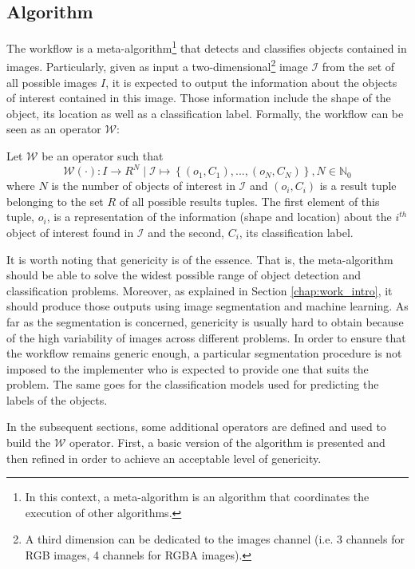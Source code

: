 \subsection{Algorithm}
\label{ssec:workflow_algo}
The workflow is a meta-algorithm\footnote{In this context, a meta-algorithm is an algorithm that coordinates the execution of other algorithms.} that detects and classifies objects contained in images. Particularly, given as input a two-dimensional\footnote{A third dimension can be dedicated to the images channel (i.e. 3 channels for RGB images, 4 channels for RGBA images).} image $\mathcal{I}$ from the set of all possible images $I$, it is expected to output the information about the objects of interest contained in this image. Those information include the shape of the object, its location as well as a classification label. Formally, the workflow can be seen as an operator $\mathcal{W}$:

\begin{definition} Let $\mathcal{W}$ be an operator such that 
	\begin{equation}\label{eqn:workflow_operator}
		\mathcal{W}(\cdot) : I \rightarrow R^N \mid \mathcal{I} \mapsto \left\{(o_1,C_1),...,(o_N, C_N)\right\}, N \in \mathbb{N}_0
	\end{equation}
	where $N$ is the number of objects of interest in $\mathcal{I}$ and $(o_i, C_i)$ is a result tuple belonging to the set $R$ of all possible results tuples. The first element of this tuple, $o_i$, is a representation of the information (shape and location) about the $i^{th}$ object of interest found in $\mathcal{I}$ and the second, $C_i$, its classification label. 
\end{definition}

It is worth noting that genericity is of the essence. That is, the meta-algorithm should be able to solve the widest possible range of object detection and classification problems. Moreover, as explained in Section \ref{chap:work_intro}, it should produce those outputs using image segmentation and machine learning. As far as the segmentation is concerned, genericity is usually hard to obtain because of the high variability of images across different problems. In order to ensure that the workflow remains generic enough, a particular segmentation procedure is not imposed to the implementer who is expected to provide one that suits the problem. The same goes for the classification models used for predicting the labels of the objects. 

In the subsequent sections, some additional operators are defined and used to build the $\mathcal{W}$ operator. First, a basic version of the algorithm is presented and then refined in order to achieve an acceptable level of genericity.

